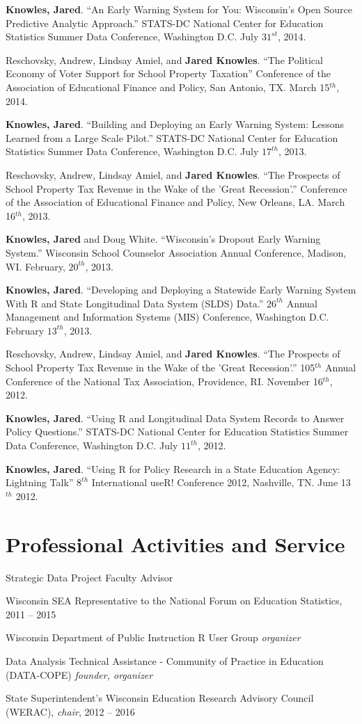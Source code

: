 \documentclass[margin,line]{res}
\begin{document}
\begin{resume}
\textbf{Knowles, Jared}. ``An Early Warning System for You: Wisconsin’s Open Source Predictive Analytic Approach.'' STATS-DC National Center for Education Statistics Summer Data Conference, Washington D.C. July $31^{st}$, 2014.

Reschovsky, Andrew, Lindsay Amiel, and \textbf{Jared Knowles}. ``The Political Economy of Voter Support for School Property Taxation'' Conference of the Association of Educational Finance and Policy, San Antonio, TX. March 15$^{th}$, 2014. 

\textbf{Knowles, Jared}. ``Building and Deploying an Early Warning System: Lessons Learned from a Large Scale Pilot.'' STATS-DC National Center for Education Statistics Summer Data Conference, Washington D.C. July $17^{th}$, 2013.

Reschovsky, Andrew, Lindsay Amiel, and \textbf{Jared Knowles}. ``The Prospects of School Property Tax Revenue in the Wake of the 'Great Recession'.'' Conference of the Association of Educational Finance and Policy, New Orleans, LA. March 16$^{th}$, 2013. 

\textbf{Knowles, Jared} and Doug White. ``Wisconsin's Dropout Early Warning System.'' Wisconsin School Counselor Association Annual Conference, Madison, WI. February, $20^{th}$, 2013. 

\textbf{Knowles, Jared}. ``Developing and Deploying a Statewide Early Warning System With R and State Longitudinal Data System (SLDS) Data.'' $26^{th}$ Annual Management and Information Systems (MIS) Conference, Washington D.C. February $13^{th}$, 2013.

Reschovsky, Andrew, Lindsay Amiel, and \textbf{Jared Knowles}. ``The Prospects of School Property Tax Revenue in the Wake of the 'Great Recession'.'' 105$^{th}$ Annual Conference of the National Tax Association, Providence, RI. November 16$^{th}$, 2012. 

\textbf{Knowles, Jared}. ``Using R and Longitudinal Data System Records to Answer Policy Questions.'' STATS-DC National Center for Education Statistics Summer Data Conference, Washington D.C. July $11^{th}$, 2012.

\textbf{Knowles, Jared}. ``Using R for Policy Research in a State Education Agency: Lightning Talk'' $8^{th}$ International useR! Conference 2012, Nashville, TN. June 13$^{th}$ 2012.


\section{\sc Professional Activities and Service}

Strategic Data Project Faculty Advisor

Wisconsin SEA Representative to the National Forum on Education Statistics, 2011 -- 
2015

Wisconsin Department of Public Instruction R User Group \emph{organizer}

Data Analysis Technical Assistance - Community of Practice in Education (DATA-COPE) \emph{founder, organizer} 

State Superintendent's Wisconsin Education Research Advisory Council (WERAC), 
\emph{chair}, 2012 -- 2016


\end{resume}
\end{document}
